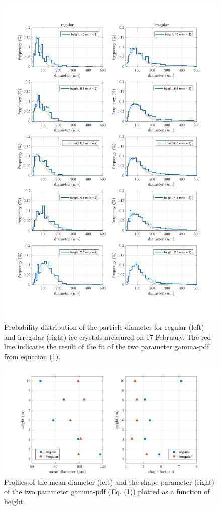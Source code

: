 \documentclass[draft,linenumbers]{agujournal}
\begin{document}
\begin{figure}[t]
 \centering
 	\includegraphics[width=14cm]{gammaPDF.png}
 \caption{Probability distribution of the particle diameter for regular (left) and irregular (right) ice crystals measured on 17 February. The red line indicates the result of the fit of the two parameter gamma-pdf from equation (1).}
 \label{fig:gammaPDF}
\end{figure}

\begin{figure}[t]
 \centering
 	\includegraphics[width=14cm]{MeanShape.png}
 \caption{Profiles of the mean diameter (left) and the shape parameter (right) of the two parameter gamma-pdf (Eq. (1)) plotted as a function of height.}
 \label{fig:shapeFactor}
\end{figure}
\end{document}
